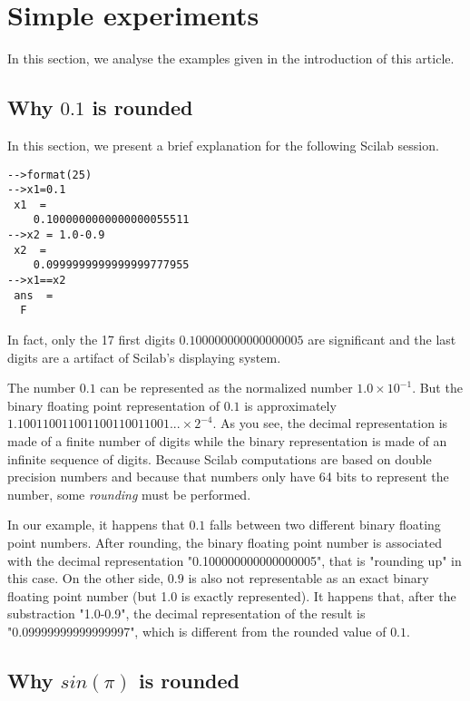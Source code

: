 \section{Simple experiments}

In this section, we analyse the examples given in the introduction of this 
article.

\subsection{Why $0.1$ is rounded}

In this section, we present a brief explanation for the 
following Scilab session.

\begin{verbatim}
-->format(25)
-->x1=0.1
 x1  =
    0.1000000000000000055511  
-->x2 = 1.0-0.9
 x2  =
    0.0999999999999999777955  
-->x1==x2
 ans  =
  F  
\end{verbatim}

In fact, only the 17 first digits $0.100000000000000005$ are 
significant and the last digits are a artifact of Scilab's 
displaying system.

The number $0.1$ can be represented as the normalized number 
$1.0 \times 10^{-1}$. But the binary floating point representation
of $0.1$ is approximately \cite{WhatEveryComputerScientist} 
$1.100110011001100110011001... \times 2^{-4}$. As you see, the decimal
representation is made of a finite number of digits while the 
binary representation is made of an infinite sequence of 
digits. Because Scilab computations are based on double precision numbers
and because that numbers only have 64 bits to represent the number, 
some \emph{rounding} must be performed.

In our example, it happens that $0.1$ falls between two 
different binary floating point numbers. After rounding, 
the binary floating point number is associated with the decimal 
representation "0.100000000000000005", that is "rounding up" 
in this case. On the other side, $0.9$ is also not representable 
as an exact binary floating point number (but 1.0 is exactly represented). 
It happens that, after the substraction "1.0-0.9", the decimal representation of the 
result is "0.09999999999999997", which is different from the rounded 
value of $0.1$.

\subsection{Why $sin(\pi)$ is rounded}

